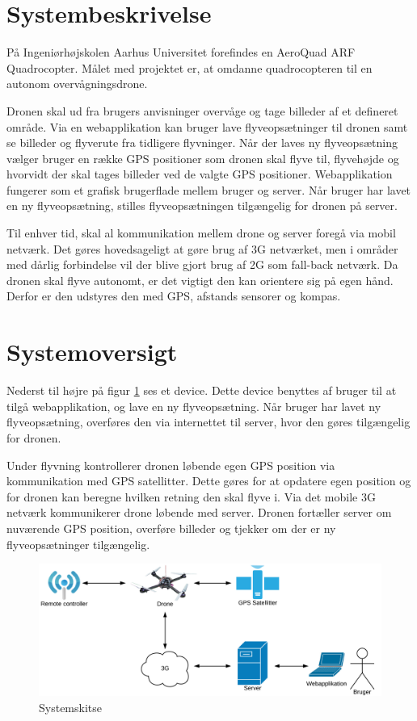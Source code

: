\section{Systembeskrivelse}
På Ingeniørhøjskolen Aarhus Universitet forefindes en AeroQuad ARF Quadrocopter. 
Målet med projektet er, at omdanne quadrocopteren til en autonom overvågningsdrone.

Dronen skal ud fra brugers anvisninger overvåge og tage billeder af et defineret område. 
Via en webapplikation kan bruger lave flyveopsætninger til dronen samt se billeder og flyverute fra tidligere flyvninger. 
Når der laves ny flyveopsætning vælger bruger en række GPS positioner som dronen skal flyve til, flyvehøjde og hvorvidt der skal tages billeder ved de valgte GPS positioner. Webapplikation fungerer som et grafisk brugerflade mellem bruger og server. Når bruger har lavet en ny flyveopsætning, stilles flyveopsætningen tilgængelig for dronen på server.  

Til enhver tid, skal al kommunikation mellem drone og server foregå via mobil netværk. Det gøres hovedsageligt at gøre brug af 3G netværket, men i områder med dårlig forbindelse vil der blive gjort brug af 2G som fall-back netværk. Da dronen skal flyve autonomt, er det vigtigt den kan orientere sig på egen hånd. Derfor er den udstyres den med GPS, afstands sensorer og kompas.



\section{Systemoversigt}
Nederst til højre på figur \ref{fig:Systemskitse} ses et device. Dette device benyttes af bruger til at tilgå webapplikation, og lave en ny flyveopsætning. Når bruger har lavet ny flyveopsætning, overføres den via internettet til server, hvor den gøres tilgængelig for dronen.
 

Under flyvning kontrollerer dronen løbende egen GPS position via kommunikation med GPS satellitter. Dette gøres for at opdatere egen position og for dronen kan beregne hvilken retning den skal flyve i. Via det mobile 3G netværk kommunikerer drone løbende med server. Dronen fortæller server om nuværende GPS position, overføre billeder og tjekker om der er ny flyveopsætninger tilgængelig. 

\vspace{-5pt}
\begin{figure}[H]
\centering
\includegraphics[width=1\textwidth]{Billeder/Projektbeskrivelse.png}
\vspace{-.5cm}
\caption{Systemskitse}
\label{fig:Systemskitse}
\end{figure}